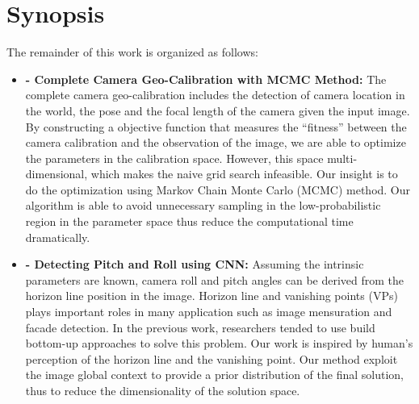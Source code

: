\section{Synopsis}

The remainder of this work is organized as follows:
  
\begin{itemize}[noitemsep]

  \item \textbf{ - 
  Complete Camera Geo-Calibration with MCMC Method:} \newline \newline
  The complete camera geo-calibration includes the detection of camera
  location in the world, the pose and the focal length of the camera
  given the input image. By constructing a objective function that
  measures the ``fitness'' between the camera calibration and the
  observation of the image, we are able to optimize the parameters in
  the calibration space. However, this space multi-dimensional, which
  makes the naive grid search infeasible. Our insight is to do the
  optimization using Markov Chain Monte Carlo (MCMC) method. Our
  algorithm is able to avoid unnecessary sampling in the
  low-probabilistic region in the parameter space thus reduce the
  computational time dramatically. \newline

  \item \textbf{ -
  Detecting Pitch and Roll using CNN:} \newline \newline
  Assuming the intrinsic parameters are known, camera roll and pitch
  angles can be derived from the horizon line position in the image.
  Horizon line and vanishing points (VPs) plays important roles in many
  application such as image mensuration and facade detection. In the
  previous work, researchers tended to use build bottom-up approaches to
  solve this problem. Our work is inspired by human's perception of the
  horizon line and the vanishing point. Our method exploit the image
  global context to provide a prior distribution of the final solution,
  thus to reduce the dimensionality of the solution space. \newline


\end{itemize}
